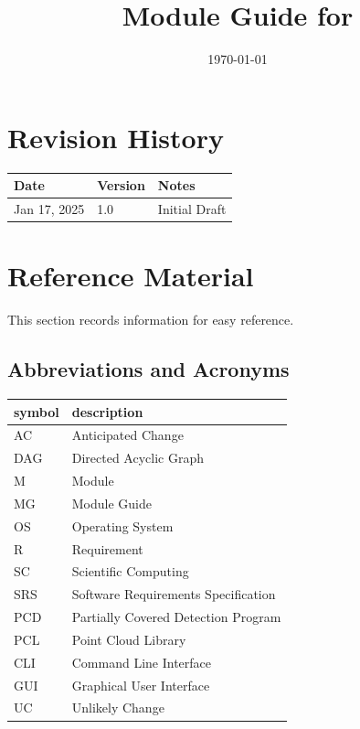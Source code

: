 \documentclass[12pt, titlepage]{article}
\begin{document}
\title{Module Guide for \progname{}} 
\author{\authname}
\date{\today}

\maketitle


\section{Revision History}

\begin{tabularx}{\textwidth}{p{3cm}p{2cm}X}
\toprule {\bf Date} & {\bf Version} & {\bf Notes}\\
\midrule
Jan 17, 2025 & 1.0 & Initial Draft\\
\bottomrule
\end{tabularx}

\newpage

\section{Reference Material}

This section records information for easy reference.

\subsection{Abbreviations and Acronyms}

\renewcommand{\arraystretch}{1.2}
\begin{tabular}{l l} 
  \toprule		
  \textbf{symbol} & \textbf{description}\\
  \midrule 
  AC & Anticipated Change\\
  DAG & Directed Acyclic Graph \\
  M & Module \\
  MG & Module Guide \\
  OS & Operating System \\
  R & Requirement\\
  SC & Scientific Computing \\
  SRS & Software Requirements Specification\\
  PCD & Partially Covered Detection Program \\
  PCL & Point Cloud Library \\
  CLI & Command Line Interface \\
  GUI & Graphical User Interface \\
  UC & Unlikely Change \\

  \bottomrule
\end{tabular}\\
\end{document}
